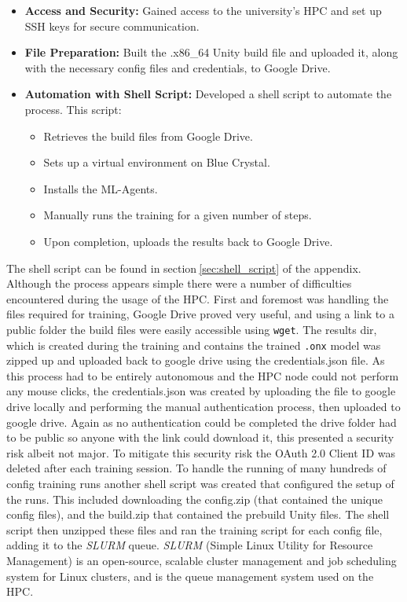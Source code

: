 \begin{itemize}
    \item \textbf{Access and Security:} Gained access to the university's HPC and set up SSH keys for secure communication.
    \item \textbf{File Preparation:} Built the .x86\_64 Unity build file and uploaded it, along with the necessary config files and credentials, to Google Drive.
    \item \textbf{Automation with Shell Script:} Developed a shell script to automate the process. This script:
    \begin{itemize}
        \item Retrieves the build files from Google Drive.
        \item Sets up a virtual environment on Blue Crystal.
        \item Installs the ML-Agents.
        \item Manually runs the training for a given number of steps.
        \item Upon completion, uploads the results back to Google Drive.
    \end{itemize}
\end{itemize}

The shell script can be found in section$~$\ref{sec:shell_script} of the appendix. Although the process appears simple there were a number of difficulties encountered during the usage of the HPC. First and foremost was handling the files required for training, Google Drive proved very useful, and using a link to a public folder the build files were easily accessible using \texttt{wget}. The results dir, which is created during the training and contains the trained \texttt{.onx} model was zipped up and uploaded back to google drive using the credentials.json file. As this process had to be entirely autonomous and the HPC node could not perform any mouse clicks, the credentials.json was created by uploading the file to google drive locally and performing the manual authentication process, then uploaded to google drive. Again as no authentication could be completed the drive folder had to be public so anyone with the link could download it, this presented a security risk albeit not major. To mitigate this security risk the OAuth 2.0 Client ID was deleted after each training session. To handle the running of many hundreds of config training runs another shell script was created that configured the setup of the runs. This included 
downloading the config.zip (that contained the unique config files), and the build.zip that contained the prebuild Unity files. The shell script then unzipped these files and ran the training script for each config file, adding it to the \textit{SLURM} queue. \textit{SLURM} (Simple Linux Utility for Resource Management) is an open-source, scalable cluster management and job scheduling system for Linux clusters, and is the queue management system used on the HPC. 


